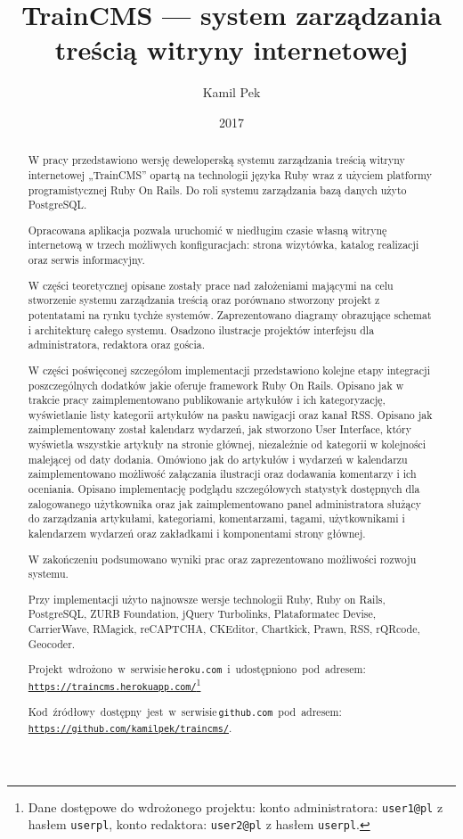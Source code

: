 \documentclass[openright]{xmgr}
\author   {Kamil Pek}
\title    {TrainCMS --- system zarządzania treścią witryny internetowej}
\date     {2017}
\begin{document}
\begin{abstract}
W pracy przedstawiono wersję deweloperską systemu zarządzania treścią witryny internetowej  „TrainCMS” opartą na technologii języka Ruby wraz z użyciem platformy programistycznej Ruby On Rails. Do roli systemu zarządzania bazą danych użyto PostgreSQL.

Opracowana aplikacja pozwala uruchomić w niedługim czasie własną witrynę internetową w trzech możliwych konfiguracjach: strona wizytówka, katalog realizacji oraz serwis informacyjny.

W części teoretycznej opisane zostały prace nad założeniami mającymi na celu stworzenie systemu zarządzania treścią oraz porównano stworzony projekt z potentatami na rynku tychże systemów. Zaprezentowano diagramy obrazujące schemat i architekturę całego systemu. Osadzono ilustracje projektów interfejsu dla administratora, redaktora oraz gościa.

W części poświęconej szczegółom implementacji przedstawiono kolejne etapy integracji poszczególnych dodatków jakie oferuje framework Ruby On Rails. Opisano jak w trakcie pracy zaimplementowano publikowanie artykułów i ich kategoryzację, wyświetlanie listy kategorii artykułów na pasku nawigacji oraz kanał RSS. Opisano jak zaimplementowany został kalendarz wydarzeń, jak stworzono User Interface, który wyświetla wszystkie artykuły na stronie głównej, niezależnie od kategorii w kolejności malejącej od daty dodania. Omówiono jak do artykułów i wydarzeń w kalendarzu zaimplementowano możliwość załączania ilustracji oraz dodawania komentarzy i ich oceniania. Opisano implementację podglądu szczegółowych statystyk dostępnych dla zalogowanego użytkownika oraz jak zaimplementowano panel administratora służący do zarządzania artykułami, kategoriami, komentarzami, tagami, użytkownikami i kalendarzem wydarzeń oraz zakładkami i komponentami strony głównej.

W zakończeniu podsumowano wyniki prac oraz zaprezentowano możliwości rozwoju systemu.

Przy implementacji użyto najnowsze wersje technologii Ruby, Ruby on Rails, PostgreSQL, ZURB Foundation, jQuery Turbolinks, Plataformatec Devise, CarrierWave, RMagick, reCAPTCHA, CKEditor, Chartkick, Prawn, RSS, rQRcode, Geocoder.

\mbox{Projekt wdrożono w serwisie\, \\\texttt{heroku.com} i udostępniono pod adresem:} \\\texttt{\url{https://traincms.herokuapp.com/}}\footnote{Dane dostępowe do wdrożonego projektu: konto administratora: \texttt{user1@pl} z hasłem \texttt{userpl}, konto redaktora: \texttt{user2@pl} z hasłem \texttt{userpl}.}

\mbox{Kod źródłowy dostępny jest w serwisie\, \\\texttt{github.com} pod adresem:} \\\texttt{\url{https://github.com/kamilpek/traincms/}}.
\end{abstract}
\end{document}
